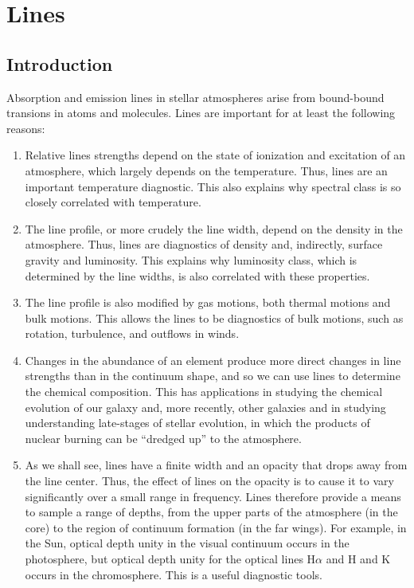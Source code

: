 
\chapter{Lines}

\section{Introduction}

\noindent
Absorption and emission lines in stellar atmospheres arise
from bound-bound transions in atoms and molecules. Lines are
important for at least the following reasons:

\begin{enumerate}
\item
Relative lines strengths depend on the state of ionization
and excitation of an atmosphere, which largely depends on
the temperature. Thus, lines are an important temperature
diagnostic. This also explains why spectral class is so
closely correlated with temperature.

\item
The line profile, or more crudely the line width, depend on
the density in the atmosphere. Thus, lines are diagnostics
of density and, indirectly, surface gravity and luminosity.
This explains why luminosity class, which is determined by
the line widths, is also correlated with these properties.

\item
The line profile is also modified by gas motions, both
thermal motions and bulk motions. This allows the lines to
be diagnostics of bulk motions, such as rotation,
turbulence, and outflows in winds.

\item
Changes in the abundance of an element produce more direct changes in
line strengths than in the continuum shape, and so we can use lines to
determine the chemical composition. This has applications in studying
the chemical evolution of our galaxy and, more recently, other galaxies
and in studying understanding late-stages of stellar evolution, in which
the products of nuclear burning can be ``dredged up'' to the atmosphere.

\item
As we shall see, lines have a finite width and an opacity
that drops away from the line center. Thus, the effect of
lines on the opacity is to cause it to vary significantly
over a small range in frequency. Lines therefore provide a
means to sample a range of depths, from the upper parts of
the atmosphere (in the core) to the region of continuum
formation (in the far wings). For example, in the Sun,
optical depth unity in the visual continuum occurs in the
photosphere, but optical depth unity for the optical lines
H$\alpha$ and  H and K occurs in the
chromosphere. This is a useful diagnostic tools.


\end{enumerate}

